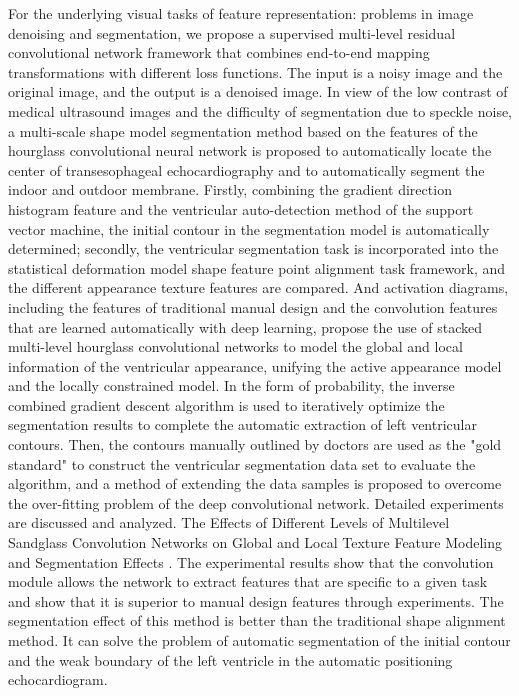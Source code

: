   For the underlying visual tasks of feature representation: problems in image denoising and segmentation, we propose a supervised multi-level residual convolutional network framework that combines end-to-end mapping transformations with different loss functions. The input is a noisy image and the original image, and the output is a denoised image. In view of the low contrast of medical ultrasound images and the difficulty of segmentation due to speckle noise, a multi-scale shape model segmentation method based on the features of the hourglass convolutional neural network is proposed to automatically locate the center of transesophageal echocardiography and to automatically segment the indoor and outdoor membrane. Firstly, combining the gradient direction histogram feature and the ventricular auto-detection method of the support vector machine, the initial contour in the segmentation model is automatically determined; secondly, the ventricular segmentation task is incorporated into the statistical deformation model shape feature point alignment task framework, and the different appearance texture features are compared. And activation diagrams, including the features of traditional manual design and the convolution features that are learned automatically with deep learning, propose the use of stacked multi-level hourglass convolutional networks to model the global and local information of the ventricular appearance, unifying the active appearance model and the locally constrained model. In the form of probability, the inverse combined gradient descent algorithm is used to iteratively optimize the segmentation results to complete the automatic extraction of left ventricular contours. Then, the contours manually outlined by doctors are used as the "gold standard" to construct the ventricular segmentation data set to evaluate the algorithm, and a method of extending the data samples is proposed to overcome the over-fitting problem of the deep convolutional network. Detailed experiments are discussed and analyzed. The Effects of Different Levels of Multilevel Sandglass Convolution Networks on Global and Local Texture Feature Modeling and Segmentation Effects . The experimental results show that the convolution module allows the network to extract features that are specific to a given task and show that it is superior to manual design features through experiments. The segmentation effect of this method is better than the traditional shape alignment method. It can solve the problem of automatic segmentation of the initial contour and the weak boundary of the left ventricle in the automatic positioning echocardiogram.

